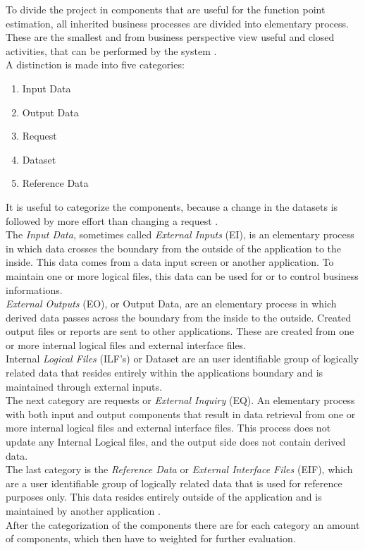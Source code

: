 To divide the project in components that are useful for the function point estimation, all inherited business processes are divided into elementary process. These are the smallest and from business perspective view useful and closed activities, that can be performed by the system \cite{FPKompakt}.\\
A distinction is made into five categories:
\begin{enumerate}
	\item Input Data
	\item Output Data
	\item Request
	\item Dataset
	\item Reference Data
\end{enumerate}
It is useful to categorize the components, because a change in the datasets is followed by more effort than changing a request \cite{itplanung}.\\
The \textit{Input Data}, sometimes called \textit{External Inputs} (EI), is an elementary process in which data crosses the boundary from the outside of the application to the inside. This data comes from a data input screen or another application. To maintain one or more logical files, this data can be used for or to control business informations.\\
\textit{External Outputs} (EO), or Output Data, are an elementary process in which derived data passes across the boundary from the inside to the outside. Created output files or reports are sent to other applications. These are created from one or more internal logical files and external interface files.\\
Internal \textit{Logical Files} (ILF’s) or Dataset are an user identifiable group of logically related data that resides entirely within the applications boundary and is maintained through external inputs.\\
The next category are requests or \textit{External Inquiry} (EQ). An elementary process with both input and output components that result in data retrieval from one or more internal logical files and external interface files. This process does not update any Internal Logical files, and the output side does not contain derived data.\\
The last category is the \textit{Reference Data} or \textit{External Interface Files} (EIF), which are a user identifiable group of logically related data that is used for reference purposes only. This data resides entirely outside of the application and is maintained by another application \cite{fpafundamentals}.\\
After the categorization of the components there are for each category an amount of components, which then have to weighted for further evaluation.

